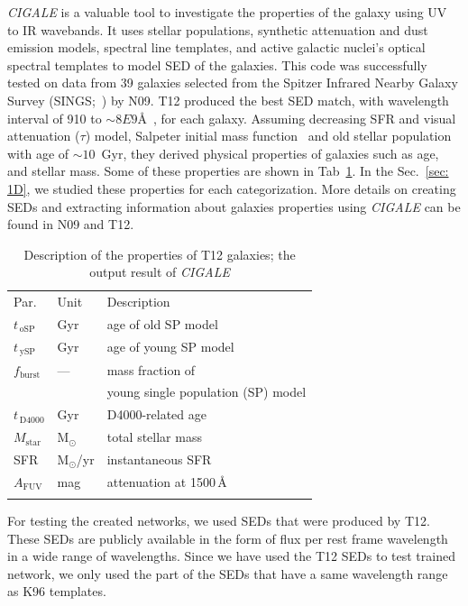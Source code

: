     {\em CIGALE} is a valuable tool to investigate the properties of the galaxy using UV to IR wavebands.
    It uses stellar populations, synthetic attenuation and dust emission models, spectral line templates, and active galactic nuclei's optical spectral templates to model SED of the galaxies.
    This code was successfully tested on data from 39 galaxies selected from the Spitzer Infrared Nearby Galaxy Survey (SINGS;~\citep{Kennicutt03}) by N09.
    T12 produced the best SED match, with wavelength interval of 910 to $\sim 8E9$\AA~, for each galaxy.
    Assuming decreasing SFR and visual attenuation ($\tau$) model, Salpeter initial mass function~\citep{Salpeter55} and old stellar population with age of $\sim 10$~Gyr, they derived physical properties of galaxies such as age, and stellar mass.
    Some of these properties are shown in Tab~\ref{tab: props}.
    In the Sec.~\ref{sec: 1D}, we studied these properties for each categorization.
    More details on creating SEDs and extracting information about galaxies properties using {\em CIGALE} can be found in N09 and T12.
    
       
    \begin{table}
\caption[]{Description of the properties of T12 galaxies; the output result of {\em CIGALE}}     
\label{tab: props}
\centering
\begin{tabular}{l l l}
\hline\hline
\noalign{\smallskip}
Par. & Unit & Description\\
\noalign{\smallskip}
\hline
\noalign{\smallskip}
$t_{\,\mathrm{oSP}}$ & Gyr & age of old SP model \\
$t_{\,\mathrm{ySP}}$ & Gyr & age of young SP model \\
$f_\mathrm{burst}$ & --- & mass fraction of \\
& & young single population (SP) model \\
\noalign{\smallskip}
$t_{\,\mathrm{D4000}}$ & Gyr & D4000-related age \\
\noalign{\smallskip}
$M_\mathrm{star}$ & M$_\odot$ & total stellar mass  \\
SFR & M$_\odot$/yr & instantaneous SFR  \\
$A_\mathrm{FUV}$ & mag & attenuation at 1500\,\AA{} \\
\noalign{\smallskip}
\hline
\end{tabular}
\end{table}

    For testing the created networks, we used SEDs that were produced by T12. 
    These SEDs are publicly available in the form of flux per rest frame wavelength in a wide range of wavelengths.
    Since we have used the T12 SEDs to test trained network, we only used the part of the SEDs that have a same wavelength range as K96 templates.  
 
